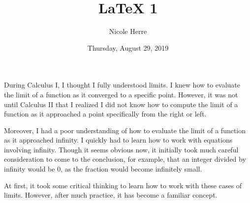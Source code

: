 \documentclass[12pt]{article}
\title{LaTeX 1}
\author{Nicole Herre}
\date{Thursday, August 29, 2019}
\begin{document}
\maketitle

During Calculus I, I thought I fully understood limits. I knew how to evaluate the limit of a function as it converged to a specific point. However, it was not until Calculus II that I realized I did not know how to compute the limit of a function as it approached a point specifically from the right or left. 




Moreover, I had a poor understanding of how to evaluate the limit of a function as it approached infinity. I quickly had to learn how to work with equations involving infinity. Though it seems obvious now, it initially took much careful consideration to come to the conclusion, for example, that an integer divided by infinity would be 0, as the fraction would become infinitely small. 




At first, it took some critical thinking to learn how to work with these cases of limits. However, after much practice, it has become a familiar concept. 
\end{document}
